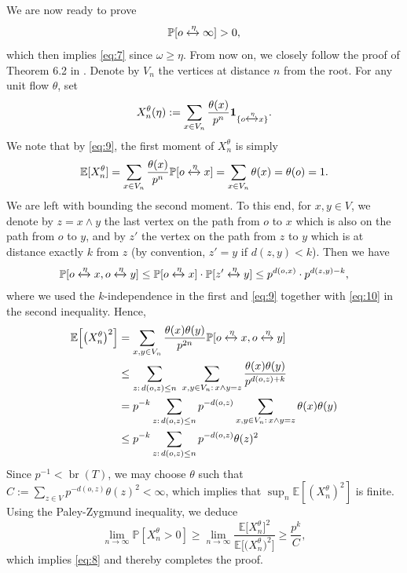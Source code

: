 \documentclass[11pt]{article}
\DeclareMathOperator{\br}{br}
\theoremstyle{remark}
\begin{document}
We are now ready to prove 
\begin{equation}\label{eq:8}
	\mathbb P[o\xleftrightarrow{\eta} \infty] >0,
\end{equation}
which then implies \eqref{eq:7} since $\omega \ge \eta$. From now on, we closely follow the proof of Theorem 6.2 in \cite{Lyons1990}. Denote by $V_n$ the vertices at distance $n$ from the root. For any unit flow $\theta$, set
\begin{equation}
	X_n^\theta(\eta) := \sum_{x \in V_n} \frac{\theta(x)}{p^{n}} \mathbf{1}_{\{o \xleftrightarrow{\eta}x\}}.
\end{equation}
We note that by \eqref{eq:9}, the first moment of $X_n^\theta$ is simply 
\begin{equation}
	\mathbb E[X_n^\theta] = \sum_{x \in V_n} \frac{\theta(x)}{p^{n}} \mathbb P[o \xleftrightarrow{\eta}x] = \sum_{x \in V_n} \theta(x) = \theta(o) = 1.
\end{equation}
We are left with bounding the second moment. To this end, for $x,y \in V$, we denote by $z = x\wedge y$ the last vertex on the path from $o$ to $x$ which is also on the path from $o$ to $y$, and by $z'$ the vertex on the path from $z$ to $y$ which is at distance exactly $k$ from $z$ (by convention, $z' = y$ if $d(z,y)<k$). Then we have 
\begin{align}
	\mathbb P[o \xleftrightarrow{\eta} x, o \xleftrightarrow{\eta} y] \le \mathbb P[o \xleftrightarrow{\eta} x] \cdot \mathbb P[z' \xleftrightarrow{\eta} y] \le p^{d(o,x)} \cdot p^{d(z,y)-k},
\end{align}
where we used the $k$-independence in the first  and \eqref{eq:9} together with \eqref{eq:10} in the second inequality. Hence,
\begin{align}
	\mathbb E\Big[\big(X_n^\theta\big)^2\Big] &= \sum_{x,y \in V_n} \frac{\theta(x)\theta(y)}{p^{2n}} \mathbb P[o \xleftrightarrow{\eta} x, o \xleftrightarrow{\eta} y] \\
	&\le \sum_{z:\, d(o,z)\le n}\ \sum_{x,y \in V_n:\, x\wedge y = z} \frac{\theta(x)\theta(y)}{p^{d(o,z)+k}} \\
	&= p^{-k} \sum_{z:\, d(o,z)\le n} p^{-d(o,z)} \sum_{x,y \in V_n:\, x\wedge y = z} \theta(x)\theta(y) \\
	&\le p^{-k} \sum_{z:\, d(o,z)\le n} p^{-d(o,z)} \theta(z)^2
\end{align}
Since $p^{-1} < \br(T)$, we may choose $\theta$ such that $C:=\sum_{z \in V} p^{-d(o,z)} \theta(z)^2 <\infty$, which implies that $\sup_n 	\mathbb E[(X_n^\theta)^2]$ is finite. Using the Paley-Zygmund inequality, we deduce
\begin{equation}
	\lim_{n \to \infty} \mathbb P[ X_n^\theta >0] \ge \lim_{n \to \infty} \frac{\mathbb E\big[X_n^\theta\big]^2}{\mathbb{E}\Big[\big(X_n^\theta\big)^2\Big]} \ge \frac{p^k}{C},
\end{equation} 
which implies \eqref{eq:8} and thereby completes the proof.
\end{document}
